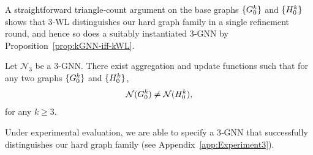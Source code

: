 

A straightforward triangle‑count argument on the base graphs 
$\{G_0^k\}$ and $\{H_0^k\}$ 
 shows that 3‑WL distinguishes our hard graph family in a single refinement round, and hence so does a suitably instantiated 3‑GNN by Proposition~\ref{prop:kGNN-iff-kWL}.


\begin{proposition}\label{prop:Dis3GNN}
Let $\mathcal{N}_3$ be a 3-GNN. There exist aggregation and update functions such that for any two graphs $\{G_0^k\}$ and $\{H_0^k\}$,
\[
\mathcal{N}(G_0^k) \neq \mathcal{N}(H_0^k),
\]    
for any $k \geq 3$.
\end{proposition}

Under experimental evaluation, we are able to specify a 3‑GNN that successfully distinguishes our hard graph family (see Appendix~\ref{app:Experiment3}).









































